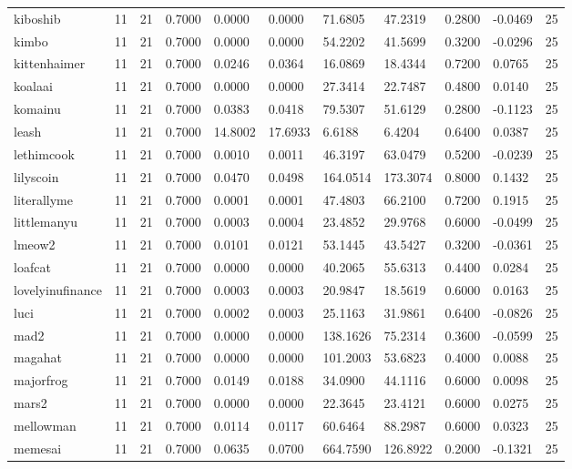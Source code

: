 \begin{table}[htbp]
\begin{tabular}{lllllllllll}
kiboshib & 11 & 21 & 0.7000 & 0.0000 & 0.0000 & 71.6805 & 47.2319 & 0.2800 & -0.0469 & 25 \\
kimbo & 11 & 21 & 0.7000 & 0.0000 & 0.0000 & 54.2202 & 41.5699 & 0.3200 & -0.0296 & 25 \\
kittenhaimer & 11 & 21 & 0.7000 & 0.0246 & 0.0364 & 16.0869 & 18.4344 & 0.7200 & 0.0765 & 25 \\
koalaai & 11 & 21 & 0.7000 & 0.0000 & 0.0000 & 27.3414 & 22.7487 & 0.4800 & 0.0140 & 25 \\
komainu & 11 & 21 & 0.7000 & 0.0383 & 0.0418 & 79.5307 & 51.6129 & 0.2800 & -0.1123 & 25 \\
leash & 11 & 21 & 0.7000 & 14.8002 & 17.6933 & 6.6188 & 6.4204 & 0.6400 & 0.0387 & 25 \\
lethimcook & 11 & 21 & 0.7000 & 0.0010 & 0.0011 & 46.3197 & 63.0479 & 0.5200 & -0.0239 & 25 \\
lilyscoin & 11 & 21 & 0.7000 & 0.0470 & 0.0498 & 164.0514 & 173.3074 & 0.8000 & 0.1432 & 25 \\
literallyme & 11 & 21 & 0.7000 & 0.0001 & 0.0001 & 47.4803 & 66.2100 & 0.7200 & 0.1915 & 25 \\
littlemanyu & 11 & 21 & 0.7000 & 0.0003 & 0.0004 & 23.4852 & 29.9768 & 0.6000 & -0.0499 & 25 \\
lmeow2 & 11 & 21 & 0.7000 & 0.0101 & 0.0121 & 53.1445 & 43.5427 & 0.3200 & -0.0361 & 25 \\
loafcat & 11 & 21 & 0.7000 & 0.0000 & 0.0000 & 40.2065 & 55.6313 & 0.4400 & 0.0284 & 25 \\
lovelyinufinance & 11 & 21 & 0.7000 & 0.0003 & 0.0003 & 20.9847 & 18.5619 & 0.6000 & 0.0163 & 25 \\
luci & 11 & 21 & 0.7000 & 0.0002 & 0.0003 & 25.1163 & 31.9861 & 0.6400 & -0.0826 & 25 \\
mad2 & 11 & 21 & 0.7000 & 0.0000 & 0.0000 & 138.1626 & 75.2314 & 0.3600 & -0.0599 & 25 \\
magahat & 11 & 21 & 0.7000 & 0.0000 & 0.0000 & 101.2003 & 53.6823 & 0.4000 & 0.0088 & 25 \\
majorfrog & 11 & 21 & 0.7000 & 0.0149 & 0.0188 & 34.0900 & 44.1116 & 0.6000 & 0.0098 & 25 \\
mars2 & 11 & 21 & 0.7000 & 0.0000 & 0.0000 & 22.3645 & 23.4121 & 0.6000 & 0.0275 & 25 \\
mellowman & 11 & 21 & 0.7000 & 0.0114 & 0.0117 & 60.6464 & 88.2987 & 0.6000 & 0.0323 & 25 \\
memesai & 11 & 21 & 0.7000 & 0.0635 & 0.0700 & 664.7590 & 126.8922 & 0.2000 & -0.1321 & 25 \\

\end{tabular}
\end{table}
